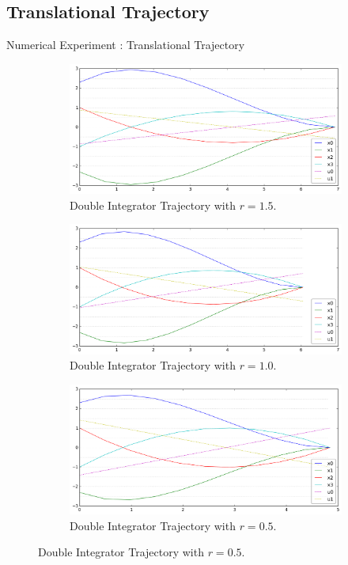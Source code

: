 \documentclass{beamer}
\begin{document}
\subsection{Translational Trajectory}
\begin{frame}{Numerical Experiment : Translational Trajectory}
\begin{figure}[H]
	\centering
	\begin{subfigure}{0.4\textwidth}
		\centering
		\includegraphics[width=1.0\linewidth]{assets/fig1}
		\caption{Double Integrator Trajectory with $r=1.5$.}
		\label{trajectory1}
	\end{subfigure}
	\begin{subfigure}{0.4\textwidth}
		\includegraphics[width=1.0\linewidth]{assets/fig2}
		\caption{Double Integrator Trajectory with $r=1.0$.}
		\label{trajectory2}
	\end{subfigure}
	\begin{subfigure}{0.4\textwidth}
		\centering
		\includegraphics[width=1.0\linewidth]{assets/fig3}
		\caption{Double Integrator Trajectory with $r=0.5$.}
		\label{trajectory3}
	\end{subfigure}
\end{figure}
\end{frame}
\end{document}
